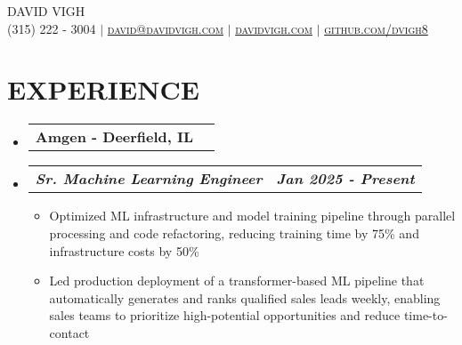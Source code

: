 \documentclass[letterpaper,11pt]{article}
\makeatletter
\newcommand{\resumeItem}[1]{
  \item\small{
    {#1 \vspace{0pt}}
  }
}
\newcommand{\resumeSubheading}[2]{
  \vspace{-1pt}\item
    \begin{tabular*}{0.97\textwidth}[t]{l@{\extracolsep{\fill}}r}
      \textbf{\small#1 - \small#2} 
    \end{tabular*}\vspace{-13pt}
}
\newcommand{\resumeSubSubheading}[2]{
    \item
    \vspace{2pt}
    \begin{tabular*}{0.97\textwidth}{l@{\extracolsep{\fill}}r}
      \textbf{\textit{\small#1}} & \textbf{\textit{\small#2}} \\
    \end{tabular*}\vspace{-5pt}
}
\newcommand{\resumeHeadingListStart}{\begin{itemize}[leftmargin=0.05in, label={}]}
\newcommand{\resumeHeadingListEnd}{\end{itemize}}
\newcommand{\resumeSubHeadingListStart}{\begin{itemize}[leftmargin=0.15in, label={}]}
\newcommand{\resumeSubHeadingListEnd}{\end{itemize}\vspace{-15pt}}
\newcommand{\resumeItemListStart}{\begin{itemize}[leftmargin=0.15in]}
\newcommand{\resumeItemListEnd}{\end{itemize}\vspace{-10pt}}
\makeatother
\begin{document}
\thispagestyle{fancy}
\fancyhf{} %
\fancyheadoffset[R]{-0.1cm}

\begin{center}
    \Huge \scshape DAVID VIGH \\ \vspace{1pt}
    \small (315) 222 - 3004 $|$ 
    \href{mailto:david@davidvigh.com}{david@davidvigh.com} $|$ 
    \href{https://www.davidvigh.com/}{davidvigh.com} $|$
    \href{https://github.com/dvigh8}{github.com/dvigh8} \\ \vspace{-5pt}
\end{center}


\section{\textbf{EXPERIENCE}}

    \resumeHeadingListStart
        \resumeSubheading{Amgen}{Deerfield, IL}
    \resumeHeadingListEnd
        \resumeSubHeadingListStart
            \resumeSubSubheading {Sr. Machine Learning Engineer}{Jan 2025 - Present}
            \resumeItemListStart
                \resumeItem{Optimized ML infrastructure and model training pipeline through parallel processing and code refactoring, reducing training time by 75\% and infrastructure costs by 50\%}
                \resumeItem{Led production deployment of a transformer-based ML pipeline that automatically generates and ranks qualified sales leads weekly, enabling sales teams to prioritize high-potential opportunities and reduce time-to-contact}
                            
            \resumeItemListEnd
        \resumeSubHeadingListEnd
\end{document}
